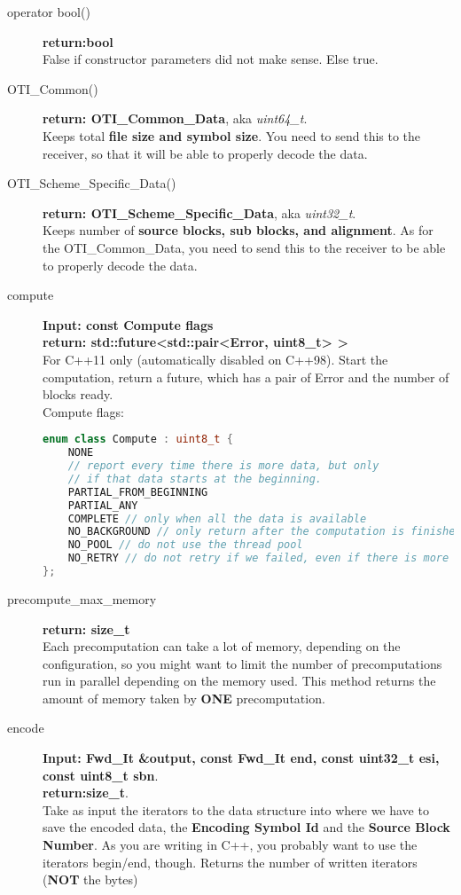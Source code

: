 \documentclass[11pt,a4paper]{refart}
\begin{document}
\begin{description}
\item[operator bool()] \textbf{return:bool}\\
False if constructor parameters did not make sense. Else true.

\item[OTI\_Common()] \textbf{return: OTI\_Common\_Data}, aka \textit{uint64\_t}.\\
Keeps total \textbf{file size and symbol size}. You need to send this to the receiver, so that it will be able to properly decode the data.

\item[OTI\_Scheme\_Specific\_Data()] \textbf{return: OTI\_Scheme\_Specific\_Data}, aka \textit{uint32\_t}.\\
Keeps number of \textbf{source blocks, sub blocks, and alignment}. As for the OTI\_Common\_Data, you need to send this to the receiver to be able to
properly decode the data.

\item[compute] \textbf{Input: const Compute flags}\\
\textbf{return: std::future<std::pair<Error, uint8\_t> >}\\
For C++11 only (automatically disabled on C++98). Start the computation, return a future, which has a pair of Error and the number of blocks ready.\\
Compute flags:
\begin{lstlisting}[language=C++]
enum class Compute : uint8_t {
	NONE 
	// report every time there is more data, but only
	// if that data starts at the beginning.
	PARTIAL_FROM_BEGINNING
	PARTIAL_ANY
	COMPLETE // only when all the data is available
	NO_BACKGROUND // only return after the computation is finished
	NO_POOL // do not use the thread pool
	NO_RETRY // do not retry if we failed, even if there is more data
};
\end{lstlisting}

\item [precompute\_max\_memory] \textbf{return: size\_t}\\
Each precomputation can take a lot of memory, depending on the configuration, so you might want to limit the number of precomputations run in parallel
depending on the memory used. This method returns the amount of memory taken by \textbf{ONE} precomputation.

\item[encode] \textbf{Input: Fwd\_It \&output, const Fwd\_It end, const uint32\_t esi, const uint8\_t sbn}.\\
\textbf{return:size\_t}.\\
Take as input the iterators to the data structure into where we have to save the encoded data, the \textbf{Encoding Symbol Id} and the
\textbf{Source Block Number}. As you are writing in C++, you probably want to use the iterators begin/end, though. Returns the number of written
iterators (\textbf{NOT} the bytes)


\end{description}
\end{document}
